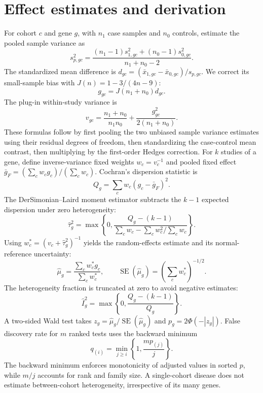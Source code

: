 \documentclass[11pt,a4paper]{article}
\begin{document}
\section{Effect estimates and derivation}
For cohort $c$ and gene $g$, with $n_1$ case samples and $n_0$ controls, estimate the pooled sample variance as
\begin{equation}s_{p,gc}^2=\frac{(n_1-1)s_{1,gc}^2+(n_0-1)s_{0,gc}^2}{n_1+n_0-2}.\end{equation}
The standardized mean difference is $d_{gc}=(\bar x_{1,gc}-\bar x_{0,gc})/s_{p,gc}$. We correct its small-sample bias with $J(n)=1-3/(4n-9)$:
\begin{equation}g_{gc}=J(n_1+n_0)d_{gc}.\end{equation}
The plug-in within-study variance is
\begin{equation}v_{gc}=\frac{n_1+n_0}{n_1n_0}+\frac{g_{gc}^2}{2(n_1+n_0)}.\end{equation}
These formulas follow by first pooling the two unbiased sample variance estimates using their residual degrees of freedom, then standardizing the case-control mean contrast, then multiplying by the first-order Hedges correction. For $k$ studies of a gene, define inverse-variance fixed weights $w_c=v_c^{-1}$ and pooled fixed effect $\bar g_F=(\sum_c w_c g_c)/(\sum_c w_c)$. Cochran's dispersion statistic is
\begin{equation}Q_g=\sum_c w_c(g_c-\bar g_F)^2.\end{equation}
The DerSimonian--Laird moment estimator subtracts the $k-1$ expected dispersion under zero heterogeneity:
\begin{equation}\hat\tau_g^2=\max\left\{0,\frac{Q_g-(k-1)}{\sum_cw_c-\sum_cw_c^2/\sum_cw_c}\right\}.\end{equation}
Using $w_c^*=(v_c+\hat\tau_g^2)^{-1}$ yields the random-effects estimate and its normal-reference uncertainty:
\begin{equation}\hat\mu_g=\frac{\sum_cw_c^*g_c}{\sum_cw_c^*},\qquad \operatorname{SE}(\hat\mu_g)=\left(\sum_cw_c^*\right)^{-1/2}.\end{equation}
The heterogeneity fraction is truncated at zero to avoid negative estimates:
\begin{equation}\hat I_g^2=\max\left\{0,\frac{Q_g-(k-1)}{Q_g}\right\}.\end{equation}
A two-sided Wald test takes $z_g=\hat\mu_g/\operatorname{SE}(\hat\mu_g)$ and $p_g=2\Phi(-|z_g|)$. False discovery rate for $m$ ranked tests uses the backward minimum
\begin{equation}q_{(i)}=\min_{j\geq i}\left\{1,\frac{m p_{(j)}}{j}\right\}.\end{equation}
The backward minimum enforces monotonicity of adjusted values in sorted $p$, while $m/j$ accounts for rank and family size. A single-cohort disease does not estimate between-cohort heterogeneity, irrespective of its many genes.
\end{document}
